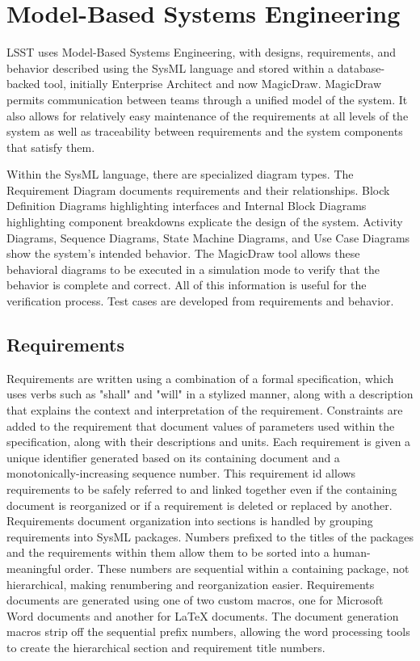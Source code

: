 \section{Model-Based Systems Engineering}

LSST uses Model-Based Systems Engineering, with designs, requirements, and behavior described using the SysML language and stored within a database-backed tool, initially Enterprise Architect and now MagicDraw.
MagicDraw permits communication between teams through a unified model of the system.
It also allows for relatively easy maintenance of the requirements at all levels of the system as well as traceability between requirements and the system components that satisfy them.

Within the SysML language, there are specialized diagram types.
The Requirement Diagram documents requirements and their relationships.
Block Definition Diagrams highlighting interfaces and Internal Block Diagrams highlighting component breakdowns explicate the design of the system.
Activity Diagrams, Sequence Diagrams, State Machine Diagrams, and Use Case Diagrams show the system's intended behavior.
The MagicDraw tool allows these behavioral diagrams to be executed in a simulation mode to verify that the behavior is complete and correct.
All of this information is useful for the verification process.
Test cases are developed from requirements and behavior.

\subsection{Requirements}

Requirements are written using a combination of a formal specification, which uses verbs such as "shall" and "will" in a stylized manner, along with a description that explains the context and interpretation of the requirement.
Constraints are added to the requirement that document values of parameters used within the specification, along with their descriptions and units.
Each requirement is given a unique identifier generated based on its containing document and a monotonically-increasing sequence number.
This requirement id allows requirements to be safely referred to and linked together even if the containing document is reorganized or if a requirement is deleted or replaced by another.
Requirements document organization into sections is handled by grouping requirements into SysML packages.
Numbers prefixed to the titles of the packages and the requirements within them allow them to be sorted into a human-meaningful order.
These numbers are sequential within a containing package, not hierarchical, making renumbering and reorganization easier.
Requirements documents are generated using one of two custom macros, one for Microsoft Word documents and another for LaTeX documents.
The document generation macros strip off the sequential prefix numbers, allowing the word processing tools to create the hierarchical section and requirement title numbers.

